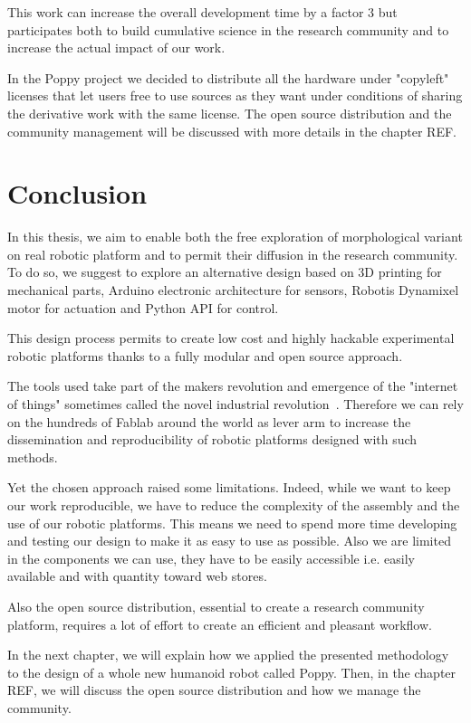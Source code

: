 This work can increase the overall development time by a factor 3 but participates both to build cumulative science in the research community and to increase the actual impact of our work.

In the Poppy project we decided to distribute all the hardware under "copyleft" licenses that let users free to use sources as they want under conditions of sharing the derivative work with the same license.
The open source distribution and the community management will be discussed with more details in the chapter REF.


\section{Conclusion} %

In this thesis, we aim to enable both the free exploration of morphological variant on real robotic platform and to permit their diffusion in the research community. To do so, we suggest to explore an alternative design based on 3D printing for mechanical parts, Arduino electronic architecture for sensors, Robotis Dynamixel motor for actuation and Python API for control.

This design process permits to create low cost and highly hackable experimental robotic platforms thanks to a fully modular and open source approach.

The tools used take part of the makers revolution and emergence of the "internet of things" sometimes called the novel industrial revolution~\cite{anderson}. Therefore we can rely on the hundreds of Fablab around the world as lever arm to increase the dissemination and reproducibility of robotic platforms designed with such methods.

Yet the chosen approach raised some limitations. Indeed, while we want to keep our work reproducible, we have to reduce the complexity of the assembly and the use of our robotic platforms. This means we need to spend more time developing and testing our design to make it as easy to use as possible. Also we are limited in the components we can use, they have to be easily accessible i.e. easily available and with quantity toward web stores.

Also the open source distribution, essential to create a research community platform, requires a lot of effort to create an efficient and pleasant workflow.

In the next chapter, we will explain how we applied the presented methodology to the design of a whole new humanoid robot called Poppy. Then, in the chapter REF, we will discuss the open source distribution and how we manage the community.





